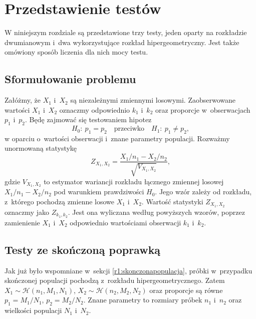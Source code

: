\chapter{Przedstawienie testów}

W niniejszym rozdziale są przedstawione trzy testy, jeden oparty na rozkładzie dwumianowym i~dwa wykorzystujące rozkład hipergeometryczny. Jest także omówiony sposób liczenia dla nich mocy testu.

\section{Sformułowanie problemu}
Załóżmy, że $X_1$ i~$X_2$ są niezależnymi zmiennymi losowymi. Zaobserwowane wartości $X_1$ i~$X_2$ oznaczmy odpowiednio $k_1$ i~$k_2$ oraz proporcje w~obserwacjach $p_1$ i~$p_2$. Będę zajmować się testowaniem hipotez
\begin{equation}
H_0{:}\ p_1=p_2\quad \text{przeciwko} \quad H_1{:}\ p_1\neq p_2,
\end{equation}
w oparciu o~wartości obserwacji i~znane parametry populacji.
Rozważmy unormowaną statystykę
\begin{equation}
Z_{X_1,X_2} = \frac{X_1/n_1-X_2/n_2}{\sqrt{V_{X_1,X_2}}},
\end{equation}
gdzie $V_{X_1,X_2}$ to estymator wariancji rozkładu łącznego zmiennej losowej $X_1/n_1-X_2/n_2$ pod warunkiem prawdziwości $H_0$. Jego wzór zależy od rozkładu, z~którego pochodzą zmienne losowe $X_1$ i~$X_2$.
Wartość statystyki $Z_{X_1,X_2}$ oznaczmy jako $Z_{k_1,k_2}$. Jest ona wyliczana według powyższych wzorów, poprzez zamienienie $X_1$ i~$X_2$ odpowiednio wartościami obserwacji $k_1$ i~$k_2$.

\section{Testy ze skończoną poprawką}
\label{r2:skonczonapoprawka}
Jak już było wspomniane w~sekcji \ref{r1:skonczonapopulacja}, próbki w~przypadku skończonej populacji pochodzą z~rozkładu hipergeometrycznego. Zatem $X_1\sim \mathcal{H}(n_1,M_1,N_1)$, $X_2\sim \mathcal{H}(n_2,M_2,N_2)$ oraz proporcje są równe $p_1=M_1/N_1$, $p_2=M_2/N_2$. Znane parametry to rozmiary próbek $n_1$ i~$n_2$ oraz wielkości populacji $N_1$ i~$N_2$.

